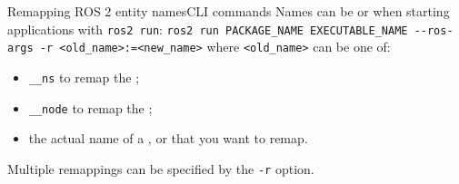 \begin{frame}{Remapping ROS 2 entity names}{CLI commands}
  Names can be  or  when starting applications with \texttt{ros2 run}:
  \newline\newline
  \texttt{ros2 run PACKAGE\_NAME EXECUTABLE\_NAME -{}-ros-args -r <old\_name>:=<new\_name>}
  \newline\newline
  where \texttt{<old\_name>} can be one of:
  \begin{itemize}
    \item \texttt{\_{}\_ns} to remap the ;
    \item \texttt{\_{}\_node} to remap the ;
    \item the actual name of a ,  or  that you want to remap.
  \end{itemize}
  \vspace{10pt}
  Multiple remappings can be specified by  the \texttt{-r} option.
\end{frame}
